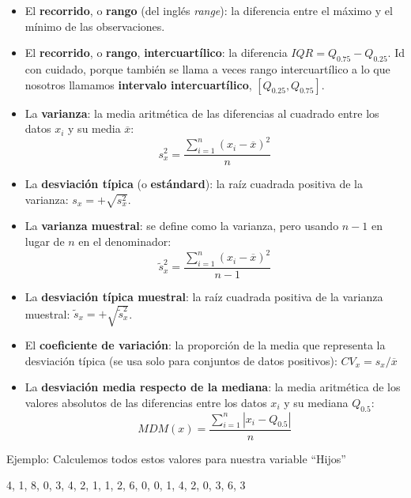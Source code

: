 \documentclass[
  spanish,
  letterpaper,
  DIV=11,
  numbers=noendperiod]{scrreprt}
\begin{document}
\begin{itemize}
\item
  El \textbf{recorrido}, o \textbf{rango} (del inglés \emph{range}): la
  diferencia entre el máximo y el mínimo de las observaciones.
\item
  El \textbf{recorrido}, o \textbf{rango}, \textbf{intercuartílico}: la
  diferencia \(\mathit{IQR}=Q_{0.75}-Q_{0.25}\). Id con cuidado, porque
  también se llama a veces rango intercuartílico a lo que nosotros
  llamamos \textbf{intervalo intercuartílico}, \([Q_{0.25},Q_{0.75}]\).
\item
  La \textbf{varianza}: la media aritmética de las diferencias al
  cuadrado entre los datos \(x_i\) y su media \(\overline{x}\): \[
  s_x^2=\frac{\sum_{i=1}^n (x_i-\overline{x})^2}{n}
  \]
\item
  La \textbf{desviación típica} (o \textbf{estándard}): la raíz cuadrada
  positiva de la varianza: \(s_x=+\sqrt{s_x^2}\).
\item
  La \textbf{varianza muestral}: se define como la varianza, pero usando
  \(n-1\) en lugar de \(n\) en el denominador: \[
  \tilde{s}_x^2 =\frac{\sum_{i=1}^n (x_i-\overline{x})^2}{n-1}
  \]
\item
  La \textbf{desviación típica muestral}: la raíz cuadrada positiva de
  la varianza muestral: \(\tilde{s}_x=+\sqrt{\tilde{s}_x^2}\).
\item
  El \textbf{coeficiente de variación}: la proporción de la media que
  representa la desviación típica (se usa solo para conjuntos de datos
  positivos): \(CV_x=s_x/\overline{x}\)
\item
  La \textbf{desviación media respecto de la mediana}: la media
  aritmética de los valores absolutos de las diferencias entre los datos
  \(x_i\) y su mediana \(Q_{0.5}\): \[
  MDM(x)=\frac{\sum_{i=1}^n |x_i-Q_{0.5}|}{n}
  \]
\end{itemize}

Ejemplo: Calculemos todos estos valores para nuestra variable ``Hijos''

4, 1, 8, 0, 3, 4, 2, 1, 1, 2, 6, 0, 0, 1, 4, 2, 0, 3, 6, 3
\end{document}
